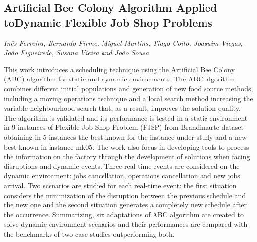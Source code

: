 \documentclass[../booklet.tex]{subfiles}
\begin{document}
\subsection[Artificial Bee Colony Algorithm Applied toDynamic Flexible Job Shop Problems. {\it Inês Ferreira, Bernardo Firme, Miguel Martins, Tiago Coito, Joaquim Viegas, João Figueiredo, Susana Vieira and João Sousa}]{Artificial Bee Colony Algorithm Applied toDynamic Flexible Job Shop Problems}
       

\begin{center}
  {\it Inês Ferreira, Bernardo Firme, Miguel Martins, Tiago Coito, Joaquim Viegas, João Figueiredo, Susana Vieira and João Sousa}
\end{center}

\vskip 0.8cm


This work introduces a scheduling technique using the Artificial Bee Colony (ABC) algorithm for static and dynamic environments.
The ABC algorithm combines different initial populations and generation of new food source methods, including a moving operations technique and a local search method increasing the variable neighbourhood search that, as a result, improves the solution quality. The algorithm is validated and its performance is tested in a static environment in 9 instances of Flexible Job Shop Problem (FJSP) from Brandimarte dataset obtaining in 5 instances the best known for the instance under study and a new best known in instance mk05.  
The work also focus in developing tools to process the information on the factory through the development of solutions when facing disruptions and dynamic events. Three real-time events are considered on the dynamic environment: jobs cancellation, operations cancellation and new jobs arrival. Two scenarios are studied for each real-time event: the first situation considers the minimization of the disruption between the previous schedule and the new one and the second situation generates a completely new schedule after the occurrence. Summarizing, six adaptations of ABC algorithm are created to solve dynamic environment scenarios and their performances are compared with the benchmarks of two case studies outperforming both. 

\end{document}
